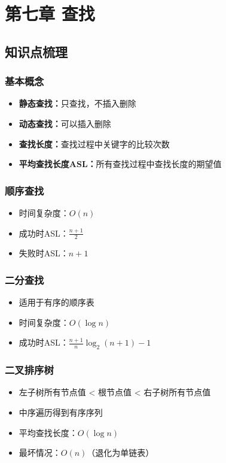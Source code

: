 \documentclass[12pt,a4paper]{amsart}
\begin{document}
\section{第七章 查找}

\subsection{知识点梳理}

\subsubsection{基本概念}
\begin{itemize}
\item \textbf{静态查找：}只查找，不插入删除
\item \textbf{动态查找：}可以插入删除
\item \textbf{查找长度：}查找过程中关键字的比较次数
\item \textbf{平均查找长度ASL：}所有查找过程中查找长度的期望值
\end{itemize}

\subsubsection{顺序查找}
\begin{itemize}
\item 时间复杂度：$O(n)$
\item 成功时ASL：$\frac{n+1}{2}$
\item 失败时ASL：$n+1$
\end{itemize}

\subsubsection{二分查找}
\begin{itemize}
\item 适用于有序的顺序表
\item 时间复杂度：$O(\log n)$
\item 成功时ASL：$\frac{n+1}{n} \log_2(n+1) - 1$
\end{itemize}

\subsubsection{二叉排序树}
\begin{itemize}
\item 左子树所有节点值 < 根节点值 < 右子树所有节点值
\item 中序遍历得到有序序列
\item 平均查找长度：$O(\log n)$
\item 最坏情况：$O(n)$（退化为单链表）
\end{itemize}
\end{document}

